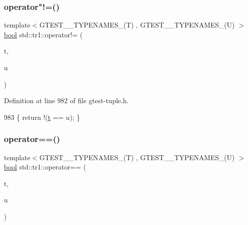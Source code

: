 \subsubsection{\texorpdfstring{operator"!=()}{operator!=()}}
{\footnotesize\ttfamily template$<$G\+T\+E\+S\+T\+\_\+\_\+\+T\+Y\+P\+E\+N\+A\+M\+E\+S\+\_\+(\+T) , G\+T\+E\+S\+T\+\_\+\_\+\+T\+Y\+P\+E\+N\+A\+M\+E\+S\+\_\+(\+U) $>$ \\
\hyperlink{classbool}{bool} std\+::tr1\+::operator!= (\begin{DoxyParamCaption}\item[{const \hyperlink{namespacestd_1_1tr1_aa636d3269bf1f368a7bc09ff158bc482}{G\+T\+E\+S\+T\+\_\+10\+\_\+\+T\+U\+P\+L\+E\+\_\+}(T)\&}]{t,  }\item[{const \hyperlink{namespacestd_1_1tr1_aa636d3269bf1f368a7bc09ff158bc482}{G\+T\+E\+S\+T\+\_\+10\+\_\+\+T\+U\+P\+L\+E\+\_\+}(U)\&}]{u }\end{DoxyParamCaption})\hspace{0.3cm}{\ttfamily [inline]}}



Definition at line 982 of file gtest-\/tuple.\+h.


\begin{DoxyCode}
983                                                     \{ \textcolor{keywordflow}{return} !(\hyperlink{namespacebattery__monitor__node_a7a63d20d1ea461e280f4eb5b47f925cd}{t} == u); \}
\end{DoxyCode}
\mbox{\label{namespacestd_1_1tr1_af4516de784404381f9b14797694b6311}} 
\subsubsection{\texorpdfstring{operator==()}{operator==()}}
{\footnotesize\ttfamily template$<$G\+T\+E\+S\+T\+\_\+\_\+\+T\+Y\+P\+E\+N\+A\+M\+E\+S\+\_\+(\+T) , G\+T\+E\+S\+T\+\_\+\_\+\+T\+Y\+P\+E\+N\+A\+M\+E\+S\+\_\+(\+U) $>$ \\
\hyperlink{classbool}{bool} std\+::tr1\+::operator== (\begin{DoxyParamCaption}\item[{const \hyperlink{namespacestd_1_1tr1_aa636d3269bf1f368a7bc09ff158bc482}{G\+T\+E\+S\+T\+\_\+10\+\_\+\+T\+U\+P\+L\+E\+\_\+}(T)\&}]{t,  }\item[{const \hyperlink{namespacestd_1_1tr1_aa636d3269bf1f368a7bc09ff158bc482}{G\+T\+E\+S\+T\+\_\+10\+\_\+\+T\+U\+P\+L\+E\+\_\+}(U)\&}]{u }\end{DoxyParamCaption})\hspace{0.3cm}{\ttfamily [inline]}}



